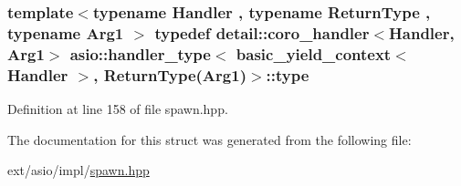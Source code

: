 \subsubsection[{type}]{\setlength{\rightskip}{0pt plus 5cm}template$<$typename Handler , typename Return\+Type , typename Arg1 $>$ typedef {\bf detail\+::coro\+\_\+handler}$<$Handler, Arg1$>$ {\bf asio\+::handler\+\_\+type}$<$ {\bf basic\+\_\+yield\+\_\+context}$<$ Handler $>$, Return\+Type(Arg1)$>$\+::{\bf type}}\label{structasio_1_1handler__type_3_01basic__yield__context_3_01_handler_01_4_00_01_return_type_07_arg1_08_4_a9c6d3bd9f6e0cbc667f5c8faa12328cc}


Definition at line 158 of file spawn.\+hpp.



The documentation for this struct was generated from the following file\+:\begin{DoxyCompactItemize}
\item 
ext/asio/impl/\hyperlink{impl_2spawn_8hpp}{spawn.\+hpp}\end{DoxyCompactItemize}
